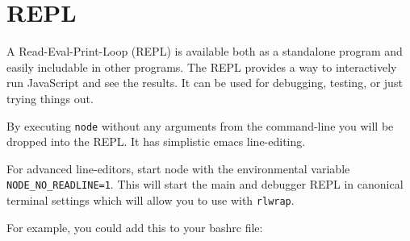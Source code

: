 \section{REPL}

\begin{Shaded}
\begin{Highlighting}[]
\NormalTok{: } 
\end{Highlighting}
\end{Shaded}

A Read-Eval-Print-Loop (REPL) is available both as a standalone program
and easily includable in other programs. The REPL provides a way to
interactively run JavaScript and see the results. It can be used for
debugging, testing, or just trying things out.

By executing \texttt{node} without any arguments from the command-line
you will be dropped into the REPL. It has simplistic emacs line-editing.

\begin{Shaded}
\begin{Highlighting}[]
  
\NormalTok{> a = [ }\NormalTok{, }\NormalTok{, }\NormalTok{];}
\NormalTok{[ }\NormalTok{, }\NormalTok{, } \NormalTok{]}
\NormalTok{> }\NormalTok{(} 
\end{Highlighting}
\end{Shaded}

For advanced line-editors, start node with the environmental variable
\texttt{NODE\_NO\_READLINE=1}. This will start the main and debugger
REPL in canonical terminal settings which will allow you to use with
\texttt{rlwrap}.

For example, you could add this to your bashrc file:

\begin{Shaded}
\begin{Highlighting}[]
\end{Highlighting}
\end{Shaded}

